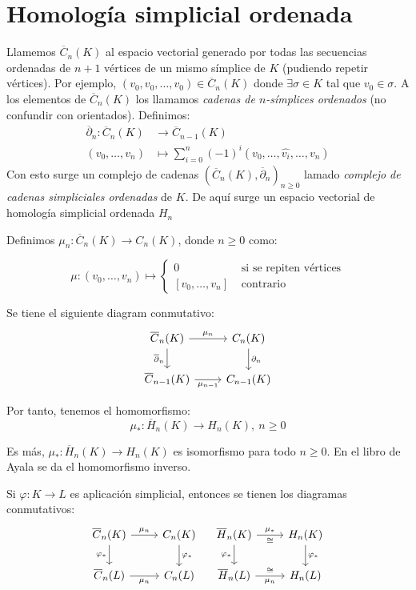 \documentclass[HS.tex]{subfiles}
\begin{document}
\section{Homología simplicial ordenada}

Llamemos $\overline{C}_n(K)$ al espacio vectorial generado por todas las secuencias ordenadas de $n+1$ vértices de un mismo símplice de $K$ (pudiendo repetir vértices).
Por ejemplo, $(v_0,v_0,\dots,v_0) \in \overline{C}_n(K)$ donde $\exists \sigma \in K$ tal que $v_0 \in \sigma$.
A los elementos de $\overline{C}_n(K)$ los llamamos \emph{cadenas de $n$-símplices ordenados} (no confundir con orientados).
Definimos:
\begin{align*}
	\overline{\partial}_n \colon \overline{C}_n(K) & \to \overline{C}_{n-1}(K)\\
	(v_0,\dots,v_n) & \mapsto \sum_{i=0}^n (-1)^i(v_0,\dots,\widehat{v_i},\dots,v_n)
\end{align*}
Con esto surge un complejo de cadenas $(\overline{C}_n(K), \overline{\partial}_n)_{n \geq 0}$ lamado \emph{complejo de cadenas simpliciales ordenadas} de $K$.
De aquí surge un espacio vectorial de homología simplicial ordenada $H_n$

Definimos $\mu_n \colon \overline{C}_n(K) \to C_n(K)$, donde $n \geq 0$ como:

\[ \mu \colon (v_0,\dots,v_n) \mapsto \begin{cases}0 & \text{ si se repiten vértices}\\ [v_0,\dots,v_n] & \text{ contrario}\end{cases}\]

\begin{propi}\mbox{}
Se tiene el siguiente diagram conmutativo:
\[\begin{tikzcd}{\overline{C}_n(K)} \arrow[r,"\mu_n"] \arrow[d,"\overline{\partial}_n" left] & {C_n(K)} \arrow[d,"\partial_n"]\\
{\overline{C}_{n-1}(K)} \arrow[r,"\mu_{n-1}" below] & C_{n-1}(K)
\end{tikzcd}\]

Por tanto, tenemos el homomorfismo:
\[ \mu_* \colon \overline{H}_n(K) \to H_n(K),\ n\geq 0\]

Es más, $\mu_* \colon \overline{H}_n(K) \to H_n(K)$ es isomorfismo para todo $n \geq 0$.
En el libro de Ayala se da el homomorfismo inverso.
\end{propi}

\begin{propi}
Si $\varphi \colon K \to L$ es aplicación simplicial, entonces se tienen los diagramas conmutativos:
\[\begin{tikzcd}{\overline{C}_n(K)} \arrow[r,"\mu_n"] \arrow[d,"\varphi_*" left] & {C_n(K)} \arrow[d,"\varphi_*"]\\
{\overline{C}_n(L)} \arrow[r,"\mu_n" below] & C_n(L)
\end{tikzcd} \quad \begin{tikzcd}{\overline{H}_n(K)} \arrow[r,"\mu_*","\cong" below] \arrow[d,"\varphi_*" left] & {H_n(K)} \arrow[d,"\varphi_*"]\\
{\overline{H}_n(L)} \arrow[r,"\mu_n" below,"\cong" above] & H_n(L)
\end{tikzcd}\]
\end{propi}
\end{document}

